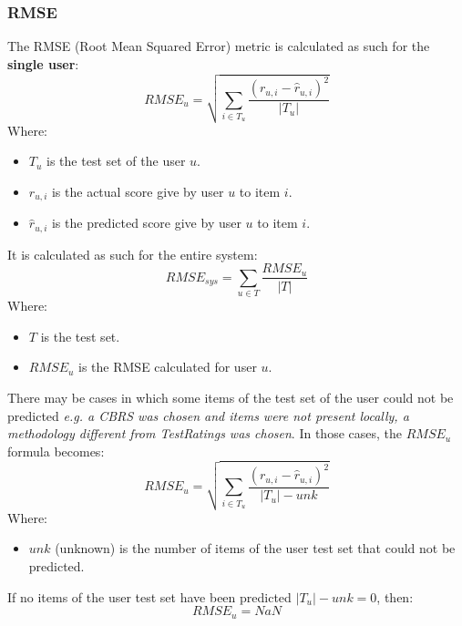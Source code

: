 \subsubsection{RMSE}\label{subsubsec:rmse}
The RMSE (Root Mean Squared Error) metric is calculated as such for the \textbf{single user}:
\hfill\break
\hfill\break
    \[
        RMSE_u = \sqrt{\sum_{i \in T_u} \frac{(r_{u,i} - \hat{r}_{u,i})^2}{|T_u|}}
    \]
\hfill\break
\hfill\break
    Where:
\begin{itemize}
    \item $T_u$ is the test set of the user $u$.
    \item $r_{u, i}$ is the actual score give by user $u$ to item $i$.
    \item $\hat{r}_{u, i}$ is the predicted score give by user $u$ to item $i$.
\end{itemize}
\hfill\break
\hfill\break
It is calculated as such for the entire system:
\hfill\break
\hfill\break
    \[
        RMSE_{sys} = \sum_{u \in T} \frac{RMSE_u}{|T|}
    \]
\hfill\break
\hfill\break
    Where:
\begin{itemize}
    \item $T$ is the test set.
    \item $RMSE_u$ is the RMSE calculated for user $u$.
\end{itemize}
\hfill\break
\hfill\break
There may be cases in which some items of the test set of the user could not be predicted
\textit{e.g. a CBRS was chosen and items were not present locally, a methodology different from TestRatings was chosen}.
In those cases, the $RMSE_u$ formula becomes:
\hfill\break
\hfill\break
    \[
        RMSE_u = \sqrt{\sum_{i \in T_u} \frac{(r_{u,i} - \hat{r}_{u,i})^2}{|T_u| - unk}}
    \]
\hfill\break
\hfill\break
    Where:
\begin{itemize}
    \item $unk$ (unknown) is the number of items of the user test set that could not be predicted.
\end{itemize}
\hfill\break
\hfill\break
If no items of the user test set have been predicted $|T_u| - unk = 0$, then:
\hfill\break
\hfill\break
    \[
        RMSE_u = NaN
    \]
\hfill\break
\hfill\break

